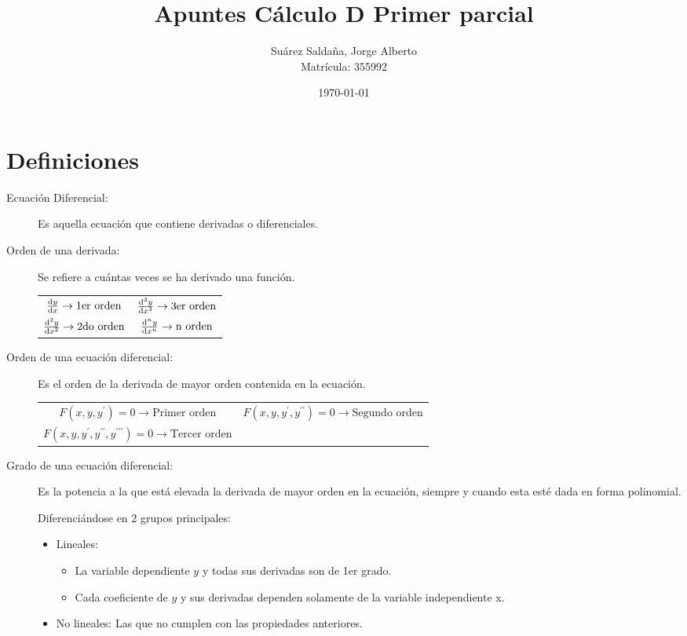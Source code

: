 \documentclass[12pt]{article} %
\title{Apuntes Cálculo D Primer parcial}
\author{Suárez Saldaña, Jorge Alberto \\ Matrícula: 355992}
\date{\today}
\theoremstyle{remark} %
\begin{document}
\maketitle

\section{Definiciones}

\begin{description}
  \item[Ecuación Diferencial:] Es aquella ecuación que contiene derivadas o diferenciales.

  \item[Orden de una derivada:] Se refiere a cuántas veces se ha derivado una función.
    \begin{table}[H]
      \centering
    \begin{tabular}{cc}
      $\dv{y}{x} \rightarrow \text{1er orden}$ & $\dv[3]{y}{x} \rightarrow \text{3er orden}$ \\[0.5em]
      $\dv[2]{y}{x} \rightarrow \text{2do orden}$ & $\dv[n]{y}{x} \rightarrow \text{n orden}$
    \end{tabular}
  \end{table}

  \item[Orden de una ecuación diferencial:] Es el orden de la derivada de mayor orden contenida en la ecuación.
    \begin{table}[H]
      \centering
    \begin{tabular}{cc}
      $F(x,y,y^{\prime}) = 0 \rightarrow \text{Primer orden}$ & 
      $F(x,y,y^{\prime},y^{\prime \prime}) = 0 \rightarrow \text{Segundo orden}$ \\[0.5em]
      $F(x,y,y^{\prime},y^{\prime \prime},y^{\prime \prime \prime}) = 0 \rightarrow \text{Tercer orden}$
    \end{tabular}
  \end{table}

\item[Grado de una ecuación diferencial:] Es la potencia a la que está elevada la derivada de mayor orden en la ecuación, 
  siempre y cuando esta esté dada en forma polinomial.

  Diferenciándose en 2 grupos principales:
  \begin{itemize}
    \item Lineales: 
      \begin{itemize}
        \item La variable dependiente $y$ y todas sus derivadas son de 1er grado.
        \item Cada coeficiente de $y$ y sus derivadas dependen solamente de la variable independiente x.
      \end{itemize}
    \item No lineales: Las que no cumplen con las propiedades anteriores.
  \end{itemize}
\end{description}
\end{document}
